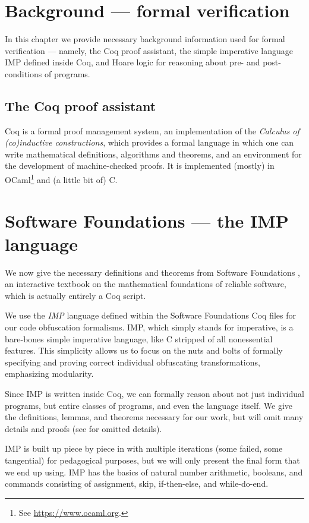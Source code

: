 \documentclass[compsoc,conference,a4paper,10pt,times]{IEEEtran}
\begin{document}
\section{Background --- formal verification}\label{two}
In this chapter we provide necessary background information used for formal verification --- namely, the Coq proof assistant, the simple imperative language IMP defined inside Coq, and Hoare logic for reasoning about pre- and post-conditions of programs.
\subsection{The Coq proof assistant}

Coq \cite{Coq} is a formal proof management system, an implementation of the \emph{Calculus of (co)inductive constructions}, which provides a formal language in which one can write mathematical definitions, algorithms and theorems, and an environment for the development of machine-checked proofs.  It is implemented (mostly) in OCaml\footnote{See \href{https://www.ocaml.org}{https://www.ocaml.org}.} and (a little bit of) C.

\section{Software Foundations --- the IMP language}
We now give the necessary definitions and theorems from Software Foundations \cite{SFV2}, an interactive textbook on the mathematical foundations of reliable software, which is actually entirely a Coq script.

\par We use the \emph{IMP} language defined within the Software Foundations Coq files for our code obfuscation formalisms.  IMP, which simply stands for imperative, is a bare-bones simple imperative language, like C stripped of all nonessential features.  This simplicity allows us to focus on the nuts and bolts of formally specifying and proving correct individual obfuscating transformations, emphasizing modularity.

\par Since IMP is written inside Coq, we can formally reason about not just individual programs, but entire classes of programs, and even the language itself.  We give the definitions, lemmas, and theorems necessary for our work, but will omit many details and proofs (see \cite{WeiRepo} for omitted details).  

\par IMP is built up piece by piece in \cite{SFV2} with multiple iterations (some failed, some tangential) for pedagogical purposes, but we will only present the final form that we end up using.  IMP has the basics of natural number arithmetic, booleans, and commands consisting of assignment, skip, if-then-else, and while-do-end.
\end{document}
